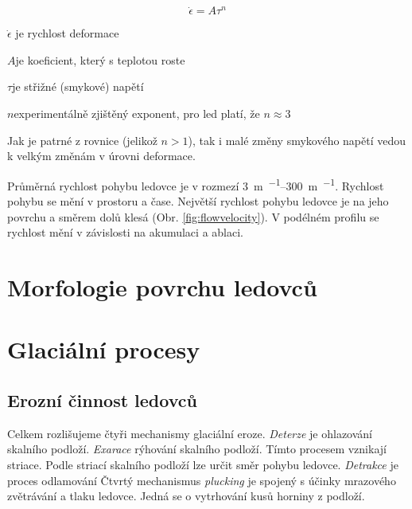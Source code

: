 \begin{equation}
	\dot{\epsilon} = A\tau^{n}
\end{equation}

\begin{eqexpl}
	\item{$\dot{\epsilon}$} je rychlost deformace
	\item{$A$}je koeficient, který s teplotou roste
	\item{$\tau$}je střižné (smykové) napětí 
	\item{$n$}experimentálně zjištěný exponent, pro led platí, že $n \approx 3$
\end{eqexpl}

Jak je patrné z rovnice (jelikož $n > 1$), tak i malé změny smykového napětí  vedou k velkým změnám v úrovni deformace.

Průměrná rychlost pohybu ledovce je v rozmezí \SIrange{3}{300}{\metre\per\rok}. Rychlost pohybu se mění v prostoru a čase. Největší rychlost pohybu ledovce je na jeho povrchu a směrem dolů klesá (Obr. \ref{fig:flowvelocity}). V podélném profilu se rychlost mění v závislosti na akumulaci a ablaci.

\section{Morfologie povrchu ledovců}

\section{Glaciální procesy}

\subsection{Erozní činnost ledovců}
Celkem rozlišujeme čtyři mechanismy glaciální eroze. \emph{Deterze} je ohlazování skalního podloží. \emph{Exarace} rýhování skalního podloží. Tímto procesem vznikají striace. Podle striací skalního podloží lze určit směr pohybu ledovce. \emph{Detrakce} je proces odlamování Čtvrtý mechanismus \emph{plucking} je spojený s účinky mrazového zvětrávání a tlaku ledovce. Jedná se o vytrhování kusů horniny z podloží.

